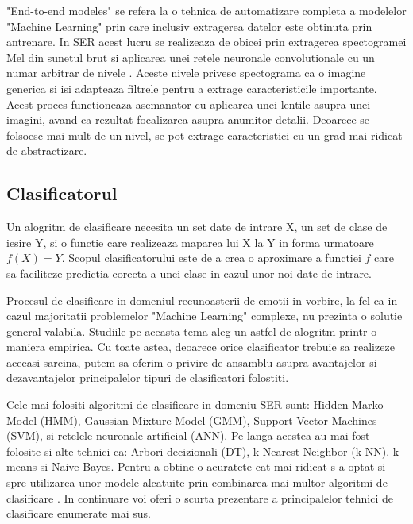 \documentclass[a4paper,12pt, twoside]{book}
\begin{document}
						"End-to-end modeles" se refera la o tehnica de automatizare completa a modelelor "Machine Learning" prin care inclusiv extragerea datelor este obtinuta prin antrenare. In SER acest lucru se realizeaza de obicei prin extragerea spectogramei Mel din sunetul brut si aplicarea unei retele neuronale convolutionale cu un numar arbitrar de nivele \cite{graves}\cite{tzir}. Aceste nivele privesc spectograma ca o imagine generica si isi adapteaza filtrele pentru a extrage caracteristicile importante. Acest proces functioneaza asemanator cu aplicarea unei lentile asupra unei imagini, avand ca rezultat focalizarea asupra anumitor detalii. Deoarece se folsoesc mai mult de un nivel, se pot extrage caracteristici cu un grad mai ridicat de abstractizare.\par 
						\newpage
					\subsection{Clasificatorul}
						Un alogritm de clasificare necesita un set date de intrare X, un set de clase de iesire Y, si o functie care realizeaza maparea lui X la Y in forma urmatoare \(f(X)=Y\). Scopul clasificatorului este de a crea o aproximare a functiei \(f\) care sa faciliteze predictia corecta a unei clase in cazul unor noi date de intrare. \par
						
						Procesul de clasificare in domeniul recunoasterii de emotii in vorbire, la fel ca in cazul majoritatii problemelor "Machine Learning" complexe, nu prezinta o solutie general valabila. Studiile pe aceasta tema aleg un astfel de alogritm printr-o maniera empirica. Cu toate astea, deoarece orice clasificator trebuie sa realizeze aceeasi sarcina, putem sa oferim o privire de ansamblu asupra avantajelor si dezavantajelor principalelor tipuri de clasificatori folostiti. \par 
						Cele mai folositi algoritmi de clasificare in domeniu SER sunt: Hidden Marko Model (HMM), Gaussian Mixture Model (GMM), Support Vector Machines (SVM), si retelele neuronale artificial (ANN). Pe langa acestea au mai fost folosite si alte tehnici ca: Arbori decizionali (DT), k-Nearest Neighbor (k-NN). k-means si Naive Bayes. Pentru a obtine o acuratete cat mai ridicat s-a optat si spre utilizarea unor modele alcatuite prin combinarea mai multor algoritmi de clasificare \cite{mehmet}.
						\iffalse In continuare voi oferi o scurta prezentare a principalelor tehnici de clasificare enumerate mai sus. \par
						
\end{document}
